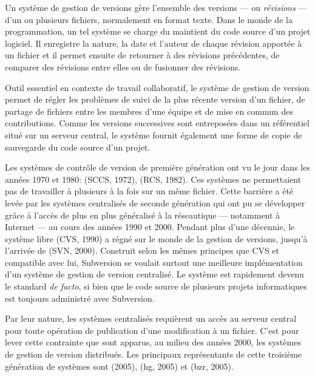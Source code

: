 Un système de gestion de versions gère l'ensemble des versions --- ou
\emph{révisions} --- d'un ou plusieurs fichiers, normalement en format
texte. Dans le monde de la programmation, un tel système se charge du
maintient du code source d'un projet logiciel. Il enregistre la
nature, la date et l'auteur de chaque révision apportée à un fichier
et il permet ensuite de retourner à des révisions précédentes, de
comparer des révisions entre elles ou de fusionner des révisions.

Outil essentiel en contexte de travail collaboratif, le système de
gestion de version permet de régler les problèmes de suivi de la plus
récente version d'un fichier, de partage de fichiers entre les membres
d'une équipe et de mise en commun des contributions. Comme les
versions successives sont entreposées dans un référentiel situé sur un
serveur central, le système fournit également une forme de copie de
sauvegarde du code source d'un projet.


Les systèmes de contrôle de version de première génération ont vu le
jour dans les années 1970 et 1980:
 (SCCS, 1972),
 (RCS, 1982). Ces systèmes ne permettaient pas de
travailler à plusieurs à la fois sur un même fichier. Cette barrière a
été levée par les systèmes centralisés de seconde génération qui ont
pu se développer grâce à l'accès de plus en plus généralisé à la
réseautique --- notamment à Internet --- au cours des années 1990 et
2000. Pendant plus d'une décennie, le système libre
 (CVS, 1990) a régné sur le monde de la gestion
de versions, jusqu'à l'arrivée de
 (SVN, 2000). Construit selon les mêmes principes que
CVS et compatible avec lui, Subversion se voulait surtout une
meilleure implémentation d'un système de gestion de version
centralisé. Le système est rapidement devenu le standard \emph{de
  facto}, si bien que le code source de plusieurs projets
informatiques est toujours administré avec Subversion.

Par leur nature, les systèmes centralisés requièrent un accès au
serveur central pour toute opération de publication d'une modification
à un fichier. C'est pour lever cette contrainte que sont apparus, au
milieu des années 2000, les systèmes de gestion de version distribués.
Les principaux représentants de cette troisième génération de systèmes
sont  (2005),
 (hg,
2005) et
(bzr, 2005).


